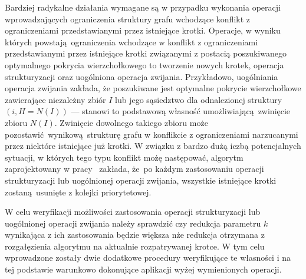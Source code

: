 \par{
  Bardziej radykalne działania wymagane są w przypadku wykonania operacji wprowadzających ograniczenia struktury grafu wchodzące konflikt z ograniczeniami przedstawianymi przez istniejące krotki.
  Operacje, w wyniku których powstają ograniczenia wchodzące w konflikt z ograniczeniami przedstawianymi przez istniejące krotki związanymi z postacią poszukiwanego optymalnego pokrycia wierzchołkowego to tworzenie nowych krotek, operacja strukturyzacji oraz uogólniona operacja zwijania.
  Przykładowo, uogólniania operacja zwijania zakłada, że poszukiwane jest optymalne pokrycie wierzchołkowe zawierające niezależny zbiór $I$ lub jego sąsiedztwo dla odnalezionej struktury $(i, H=N(I))$ --- stanowi to podstawową własność umożliwiającą zwinięcie zbioru $N(I)$.
  Zwinięcie dowolnego takiego zbioru może pozostawić wynikową strukturę grafu w konflikcie z ograniczeniami narzucanymi przez niektóre istniejące już krotki.
  W związku z bardzo dużą iczbą potencjalnych sytuacji, w których tego typu konflikt możę następować, algorytm zaprojektowany w pracy~\cite{ImprovedBounds10} zakłada, że po każdym zastosowaniu operacji strukturyzacji lub uogólnionej operacji zwijania, wszystkie istniejące krotki zostaną usunięte z kolejki priorytetowej.

  W celu weryfikacji możliwości zastosowania operacji strukturyzacji lub uogólnionej operacji zwijania należy sprawdzić czy redukcja parametru $k$ wynikająca z ich zastosowania będzie większa nże redukcja otrzymana z rozgałęzienia algorytmu na aktualnie rozpatrywanej krotce.
  W tym celu wprowadzone zostały dwie dodatkowe procedury weryfikujące te własności i na tej podstawie warunkowo dokonujące aplikacji wyżej wymienionych operacji.
}
